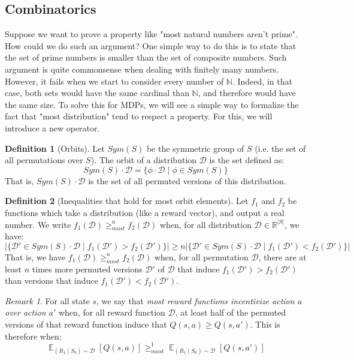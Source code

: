 \documentclass{article}
\theoremstyle{definition}
\newtheorem{definition}{Definition}[section]
\theoremstyle{remark}
\newtheorem*{remark}{Remark}
\theoremstyle{example}
\DeclareMathOperator*{\opE}{\mathbb{E}}
\newcommand*{\D}{\mathcal{D}}
\newcommand*{\brx}[1]{\left[#1\right]}  %
\newcommand*{\E}[2]{\opE_{#1}\brx{#2}}  %
\begin{document}
\subsection{Combinatorics}

Suppose we want to prove a property like "most natural numbers aren't prime". How could we do such an argument? One simple way to do this is to state that the set of prime numbers is smaller than the set of composite numbers. Such argument is quite commonsense when dealing with finitely many numbers. However, it fails when we start to consider every number of $\mathbb{N}$. Indeed, in that case, both sets would have the same cardinal than $\mathbb{N}$, and therefore would have the same size. To solve this for MDPs, we will see a simple way to formalize the fact that "most distribution" tend to respect a property. For this, we will introduce a new operator.

\begin{definition}[Orbits]
		Let $Sym(S)$ be the symmetric group of $S$ (i.e. the set of all permutations over $S$). The orbit of a distribution $\D$ is the set defined as:
				$$Sym(S) \cdot \D = \{\phi \cdot \D \mid \phi \in Sym(S)\}$$
		That is, $Sym(S) \cdot \D$ is the set of all permuted versions of this distribution.
\end{definition}

\begin{definition}[Inequalities that hold for most orbit elements]
		Let $f_1$ and $f_2$ be functions which take a distribution (like a reward vector), and output a real number. We write $f_1(\D) \geq_{most}^n f_2(\D)$ when, for all distribution $\D \in \mathbb{R}^{|S|}$, we have:
				$$|\{\D' \in Sym(S) \cdot \D \mid f_1(\D') > f_2(\D')\}| \geq n |\{\D' \in Sym(S) \cdot \D \mid f_1(\D') < f_2(\D')\}|$$
		That is, we have $f_1(\D) \geq_{most}^n f_2(\D)$ when, for all permutation $\D$, there are at least $n$ times more permuted versions $\D'$ of $\D$ that induce $f_1(\D') > f_2(\D')$ than versions that induce $f_1(\D') < f_2(\D')$.
\end{definition}

\begin{remark} %
		For all state $s$, we say that \textit{most reward functions incentivize action $a$ over action $a'$} when, for all reward function $\D$, at least half of the permuted versions of that reward function induce that $Q(s, a) \geq Q(s, a')$. This is therefore when:
				$$\E{(R_1 \mid S_0) \sim \D}{Q(s, a)} \geq_{most}^1 \E{(R_1 \mid S_0) \sim \D}{Q(s, a')}$$
\end{remark}
\end{document}

